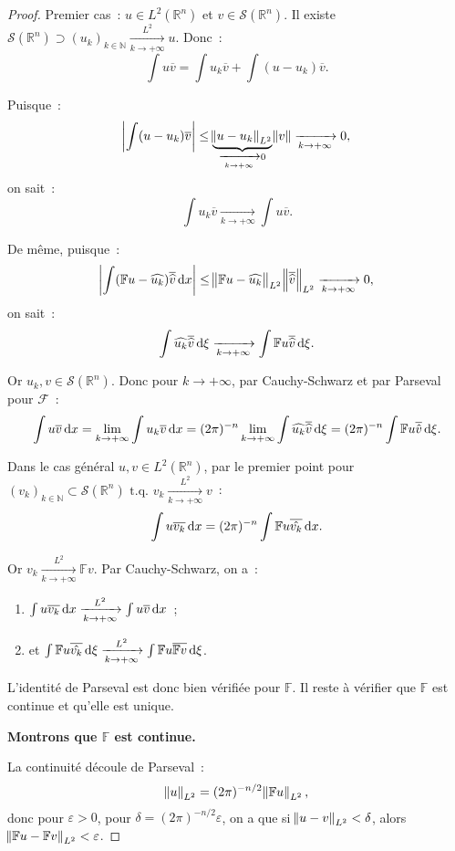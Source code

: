 \documentclass{report}
\newcommand{\R}{{\mathbb R}}
\newcommand{\N}{{\mathbb N}}
\newcommand{\tq}{\text{ t.q. }}
\newcommand{\pinfty}{{+\infty}}
\theoremstyle{definition}
\theoremstyle{remark}
\begin{document}
\begin{proof}
Premier cas~: $u \in L^2(\R^n)$ et $v \in \mathcal S(\R^n)$. Il existe $\mathcal S(\R^n) \supset (u_k)_{k \in \N} \xrightarrow[k \to \pinfty]{L^2} u$. Donc~:
\[\int u\overline v = \int u_k\overline v + \int (u-u_k)\overline v.\]

Puisque~:
\[\abs {\int (u-u_k)\overline v} \leq \underbrace {\norm {u-u_k}_{L^2}}_{\xrightarrow[k \to \pinfty]{} 0} \norm v \xrightarrow[k \to \pinfty]{} 0,\]
on sait~:
\[\int u_k\overline v \xrightarrow[k \to \pinfty]{} \int u\overline v.\]

De même, puisque~:
\[\abs {\int (\mathbb Fu - \widehat {u_k})\overline {\widehat v}\dif x} \leq \norm {\mathbb Fu - \widehat {u_k}}_{L^2}\norm {\overline {\widehat v}}_{L^2}
\xrightarrow[k \to \pinfty]{} 0,\]
on sait~:
\[\int \widehat {u_k}\overline {\widehat v}\dif\xi \xrightarrow[k \to \pinfty]{} \int\mathbb Fu\overline {\widehat v}\dif\xi.\]

Or $u_k, v \in \mathcal S(\R^n)$. Donc pour $k \to \pinfty$, par Cauchy-Schwarz et par Parseval pour $\mathcal F$~:
\[\int u\overline v\dif x = \lim_{k \to \pinfty} \int u_k\overline v\dif x = (2\pi)^{-n}\lim_{k \to \pinfty}\int \widehat {u_k}\overline {\widehat v}\dif\xi
= (2\pi)^{-n}\int\mathbb Fu\overline {\hat v}\dif \xi.\]

Dans le cas général $u, v \in L^2(\R^n)$, par le premier point pour $(v_k)_{k \in \N} \subset \mathcal S(\R^n) \tq v_k \xrightarrow[k \to \pinfty]{L^2} v$~:
\[\int u\overline {v_k}\dif x = (2\pi)^{-n}\int \mathbb Fu\overline {\hat {v_k}}\dif x.\]

Or $v_k \xrightarrow[k \to \pinfty]{L^2} \mathbb Fv$. Par Cauchy-Schwarz, on a~:
\begin{enumerate}
	\item $\int u\overline {v_k}\dif x \xrightarrow[k \to \pinfty]{L^2} \int u\overline v\dif x$~;
	\item et $\int \mathbb Fu\overline {\hat {v_k}}\dif \xi \xrightarrow[k \to \pinfty]{L^2} \int \mathbb Fu\overline {\mathbb Fv}\dif\xi$.
\end{enumerate}

L'identité de Parseval est donc bien vérifiée pour $\mathbb F$. Il reste à vérifier que $\mathbb F$ est continue et qu'elle est unique.

\textbf{Montrons que $\mathbb F$ est continue.}

La continuité découle de Parseval~:
\[\norm u_{L^2} = (2\pi)^{-n/2}\norm {\mathbb Fu}_{L^2},\]
donc pour $\varepsilon > 0$, pour $\delta = (2\pi)^{-n/2}\varepsilon$, on a que si $\norm {u-v}_{L^2} < \delta$, alors $\norm {\mathbb Fu - \mathbb Fv}_{L^2} < \varepsilon$.


\end{proof}
\end{document}
